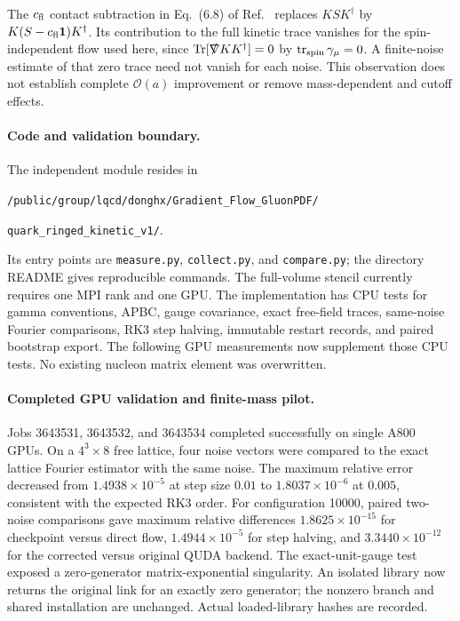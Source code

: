 \documentclass[11pt]{article}
\numberwithin{equation}{section}
\newcommand{\cO}{\mathcal{O}}
\DeclareMathOperator{\Tr}{Tr}
\begin{document}
The \(c_{\rm fl}\) contact subtraction in Eq.~(6.8) of
Ref.~\cite{Luscher2013} replaces \(KSK^\dagger\) by
\(K(S-c_{\rm fl}\mathbf1)K^\dagger\).  Its contribution to the full kinetic
trace vanishes for the spin-independent flow used here, since
\(\Tr[\slashed\nabla K K^\dagger]=0\) by
\(\operatorname{tr}_{\rm spin}\gamma_\mu=0\). A finite-noise estimate of
that zero trace need not vanish for each noise. This observation does not
establish complete \(\cO(a)\) improvement or remove mass-dependent and
cutoff effects.

\paragraph{Code and validation boundary.}
The independent module resides in
\begin{center}
\nolinkurl{/public/group/lqcd/donghx/Gradient_Flow_GluonPDF/}\par
\nolinkurl{quark_ringed_kinetic_v1/}.
\end{center}
Its entry points are \texttt{measure.py}, \texttt{collect.py}, and
\texttt{compare.py}; the directory README gives reproducible commands.
The full-volume stencil currently requires one MPI rank and one GPU.
The implementation has CPU tests for gamma conventions, APBC, gauge
covariance, exact free-field traces, same-noise Fourier comparisons, RK3
step halving, immutable restart records, and paired bootstrap export.
The following GPU measurements now supplement those CPU tests. No existing
nucleon matrix element was overwritten.

\paragraph{Completed GPU validation and finite-mass pilot.}
Jobs 3643531, 3643532, and 3643534 completed successfully on single A800 GPUs.
On a \(4^3\times8\) free lattice, four noise vectors were compared to the
exact lattice Fourier estimator with the same noise. The maximum relative
error decreased from \(1.4938\times10^{-5}\) at step size \(0.01\) to
\(1.8037\times10^{-6}\) at \(0.005\), consistent with the expected RK3
order. For configuration 10000, paired two-noise comparisons gave maximum
relative differences \(1.8625\times10^{-15}\) for checkpoint versus direct
flow, \(1.4944\times10^{-5}\) for step halving, and
\(3.3440\times10^{-12}\) for the corrected versus original QUDA backend.
The exact-unit-gauge test exposed a zero-generator matrix-exponential
singularity. An isolated library now returns the original link for an
exactly zero generator; the nonzero branch and shared installation are
unchanged. Actual loaded-library hashes are recorded.
\end{document}
